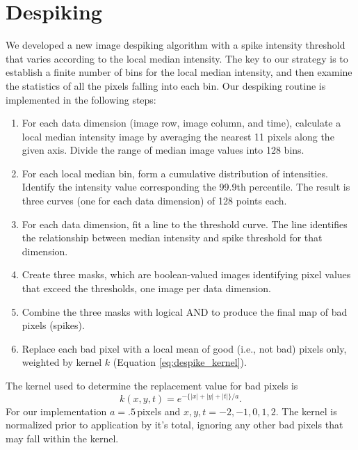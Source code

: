 \appendix
\section{Despiking}\label{despike}
    We developed a new image despiking algorithm with a spike intensity threshold that varies according to the local median intensity. The key to our strategy is to establish a finite number of bins for the local median intensity, and then examine the statistics of all the pixels falling into each bin. Our despiking routine is implemented in the following steps:
\begin{enumerate}
    \item For each data dimension (image row, image column, and time), calculate a local median intensity image by averaging the nearest 11 pixels along the given axis. Divide the range of median image values into 128 bins.
    \item For each local median bin, form a cumulative distribution of intensities. Identify the intensity value corresponding the 99.9th percentile. The result is three curves (one for each data dimension) of 128 points each. 
    \item For each data dimension, fit a line to the threshold curve. The line identifies the relationship between median intensity and spike threshold for that dimension.
    \item Create three masks, which are  boolean-valued images identifying pixel values that exceed the thresholds, one image per data dimension.
    \item Combine the three masks with logical AND to produce the final map of bad pixels (spikes). 
    \item Replace each bad pixel with a local mean of good (i.e., not bad) pixels only, weighted by kernel $k$ (Equation \ref{eq:despike_kernel}).
\end{enumerate}
The kernel used to determine the replacement value for bad pixels is
\begin{equation} \label{eq:despike_kernel}
    k(x,y,t) = e^{-\lbrace|x|+|y|+|t|\rbrace/a}.
\end{equation}
For our implementation $a=.5$\,pixels and $x,y,t= -2, -1, 0, 1 , 2$.
The kernel is normalized prior to application by it's total, ignoring any other bad pixels that may fall within the kernel.


